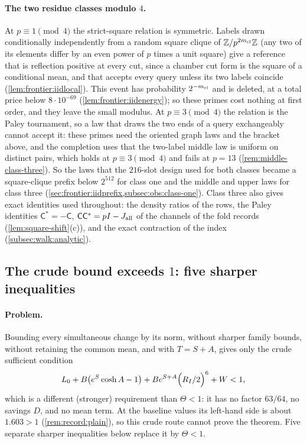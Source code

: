 \paragraph{The two residue classes modulo $4$.}
At $p\equiv1\pmod4$ the strict-square relation is symmetric. Labels drawn
conditionally independently from a random square clique of $\Z/p^{2\mcl}\Z$
(any two of its elements differ by an even power of $p$ times a unit square)
give a reference that is reflection positive at every cut, since a chamber cut
form is the square of a conditional mean, and that accepts every query unless
its two labels coincide (\cref{lem:frontier:iidlocal}). This event has
probability $2^{-\mcl}$ and is deleted, at a total price below
$8\cdot10^{-69}$ (\cref{lem:frontier:iidenergy}); so these primes cost
nothing at first order, and they leave the small modulus. At $p\equiv3\pmod4$
the relation is the Paley tournament, so a law that draws the two ends of a
query exchangeably cannot accept it: these primes need the oriented graph laws
and the bracket above, and the completion uses that the two-label middle law is
uniform on distinct pairs, which holds at $p\equiv3\pmod4$ and fails at $p=13$
(\cref{rem:middle-class-three}). So the laws that the $216$-slot design used for
both classes became a square-clique prefix below $2^{512}$ for class one and
the middle and upper laws for class three
(\cref{sec:frontier:iidprefix,subsec:obs:class-one}). Class three also gives
exact identities used throughout: the density ratios of the rows, the Paley
identities $\mathsf C^*=-\mathsf C$, $\mathsf C\mathsf C^*=pI-\Jall$ of the
channels of the fold records (\cref{lem:square-shift}(c)), and the exact
contraction of the index (\cref{subsec:walk:analytic}).

\subsection{The crude bound exceeds \texorpdfstring{$1$}{1}: five sharper inequalities}
\label{subsec:walk:accounting}

\paragraph{Problem.}
Bounding every simultaneous change by its norm, without sharper
family bounds, without retaining the common mean, and with
$T=S+A$, gives only the crude sufficient condition
\[
 L_0+B\bigl(e^S\cosh A-1\bigr)+Be^{S+A}\Bigl(\frac{R_I}2\Bigr)^6+W<1,
\]
which is a different (stronger) requirement than $\Theta<1$: it has
no factor $63/64$, no savings $D$, and no mean term. At the baseline
values its left-hand side is about $1.603>1$
(\cref{rem:record:plain}), so this crude route cannot prove the
theorem. Five separate sharper inequalities below replace it by
$\Theta<1$.

